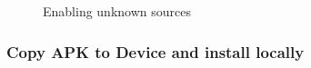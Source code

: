 \begin{figure}[H]

  \caption{Enabling unknown sources}%

  \label{fig:unknownsources}
\end{figure}

\subsubsection{Copy APK to Device and install
locally}\label{copy-apk-to-device-and-install-locally}

